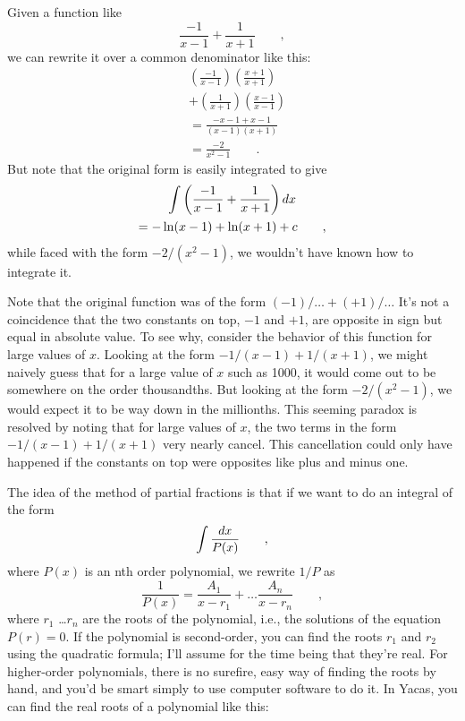 Given a function like
\begin{equation*}
  \frac{-1}{x-1}+\frac{1}{x+1} \qquad ,
\end{equation*}
we can rewrite it over a common denominator like this:
\begin{align*}
  &\left(\frac{-1}{x-1}\right)\left(\frac{x+1}{x+1}\right) \\
  &+\left(\frac{1}{x+1}\right)\left(\frac{x-1}{x-1}\right) \\
  &=\frac{-x-1+x-1}{(x-1)(x+1)} \\
  &=\frac{-2}{x^2-1} \qquad .
\end{align*}
But note that the original form is easily integrated to give
\begin{multline*}
  \int \left(\frac{-1}{x-1}+\frac{1}{x+1}\right)\mathop{d\!} x \\
    =-\ln(x-1)+\ln(x+1)+c \qquad ,
\end{multline*}
while faced with the form \linebreak[4] $-2/(x^2-1)$, we wouldn't have known how to
integrate it.

Note that the original function was of the form $(-1)/\ldots+(+1)/\ldots$
It's not a coincidence that the two constants on top, $-1$ and $+1$, are opposite in sign
but equal in absolute value. To see why, consider the behavior of
this function for large values of $x$. Looking at the form
$-1/(x-1)+1/(x+1)$, we might naively guess that for a large value of $x$
such as 1000, it would come out to be somewhere on the order thousandths.
But looking at the form $-2/(x^2-1)$, we would expect it to be way down in the millionths.
This seeming paradox is resolved by noting that for large values of $x$,
the two terms in the form $-1/(x-1)+1/(x+1)$ very nearly cancel. This cancellation
could only have happened if the constants on top were opposites like plus and minus one.

The idea of the method of partial fractions is that if we want to
do an integral of the form
\begin{equation*}
  \int \frac{\mathop{d\!} x}{P(x)} \qquad ,
\end{equation*}
where $P(x)$ is an nth order polynomial, we rewrite $1/P$ as
\begin{equation*}
  \frac{1}{P(x)} = \frac{A_1}{x-r_1} + \ldots \frac{A_n}{x-r_n} \qquad ,
\end{equation*}
where $r_1$ \ldots $r_n$ are the roots of the polynomial, i.e., the
solutions of the equation $P(r)=0$. If the polynomial is second-order,
you can find the roots $r_1$ and $r_2$ using the quadratic formula; I'll assume for
the time being that they're real.
For higher-order polynomials, there is no surefire, easy
way of finding the roots by hand, and you'd be smart simply to use computer software
to do it. In Yacas, you can find the real roots of a polynomial like this:

